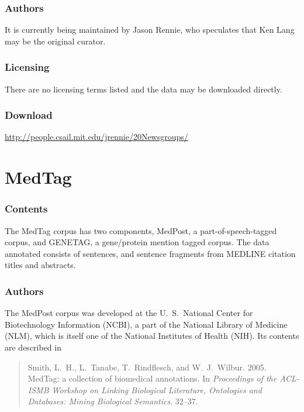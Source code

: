 \subsubsection{Authors}

It is currently being maintained by Jason Rennie, who speculates that
Ken Lang may be the original curator.

\subsubsection{Licensing}

There are no licensing terms listed and the data may be downloaded
directly.

\subsubsection{Download}

\url{http://people.csail.mit.edu/jrennie/20Newsgroups/}




\section{MedTag}\label{section:corpora-medtag}

\subsubsection{Contents}

The MedTag corpus has two components, MedPost, a part-of-speech-tagged
corpus, and GENETAG, a gene/protein mention tagged corpus.  The data
annotated consists of sentences, and sentence fragments from MEDLINE
citation titles and abstracts.

\subsubsection{Authors}

The MedPost corpus was developed at the U.~S.~National Center for
Biotechnology Information (NCBI), a part of the National Library of
Medicine (NLM), which is itself one of the National Institutes of
Health (NIH).  Its contents are described in
%
\begin{quote}
Smith, L.~H., L.~Tanabe, T.~Rindflesch, and W.~J.~Wilbur.
2005. MedTag: a collection of biomedical annotations.  In {\it
  Proceedings of the ACL-ISMB Workshop on Linking Biological
  Literature, Ontologies and Databases: Mining Biological
  Semantics}. 32--37.
\end{quote}

